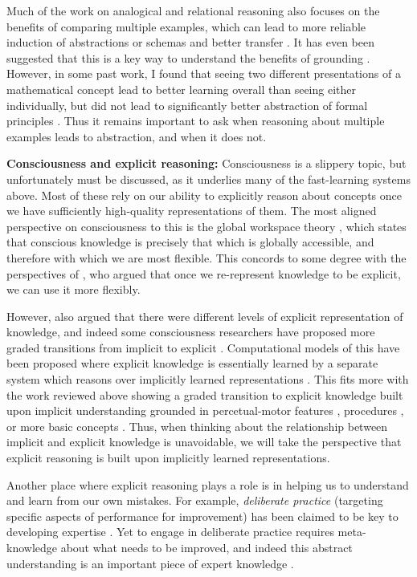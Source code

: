 \documentclass[11pt]{article}
\begin{document}
Much of the work on analogical and relational reasoning also focuses on the benefits of comparing multiple examples, which can lead to more reliable induction of abstractions or schemas and better transfer \citep{Gick1980, Gentner2017}. It has even been suggested that this is a key way to understand the benefits of grounding \citep{Jamrozik2016}. However, in some past work, I found that seeing two different presentations of a mathematical concept lead to better learning overall than seeing either individually, but did not lead to significantly better abstraction of formal principles \citep{Lampinen2017b}. Thus it remains important to ask when reasoning about multiple examples leads to abstraction, and when it does not. \par 
\textbf{Consciousness and explicit reasoning:} Consciousness is a slippery topic, but unfortunately must be discussed, as it underlies many of the fast-learning systems above. Most of these rely on our ability to explicitly reason about concepts once we have sufficiently high-quality representations of them. The most aligned perspective on consciousness to this is the global workspace theory \citep{Baars2005, Dehaene2017}, which states that conscious knowledge is precisely that which is globally accessible, and therefore with which we are most flexible. This concords to some degree with the perspectives of \citet{Karmiloff-Smith1986}, who argued that once we re-represent knowledge to be explicit, we can use it more flexibly. \par
However, \citet{Karmiloff-Smith1986} also argued that there were different levels of explicit representation of knowledge, and indeed some consciousness researchers have proposed more graded transitions from implicit to explicit \citep[e.g.]{Cleeremans2002}. Computational models of this have been proposed where explicit knowledge is essentially learned by a separate system which reasons over implicitly learned representations \citep{Cleeremans2014}. This fits more with the work reviewed above showing a graded transition to explicit knowledge built upon implicit understanding grounded in percetual-motor features \citep[e.g.]{Goldin-Meadow1993}, procedures \citep[e.g.]{Hazzan1999}, or more basic concepts \citep{Wilensky1991}. Thus, when thinking about the relationship between implicit and explicit knowledge is unavoidable, we will take the perspective that explicit reasoning is built upon implicitly learned representations. \par 
Another place where explicit reasoning plays a role is in helping us to understand and learn from our own mistakes. For example, \emph{deliberate practice} (targeting specific aspects of performance for improvement) has been claimed to be key to developing expertise \citep{Ericsson1993, Ericsson2017}. Yet to engage in deliberate practice requires meta-knowledge about what needs to be improved, and indeed this abstract understanding is an important piece of expert knowledge \citep{Feltovich2012}. \par
\end{document}

